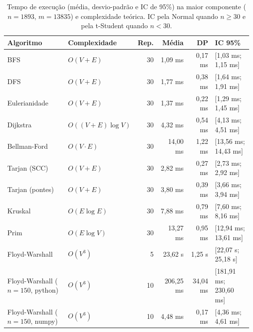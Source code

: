 \begin{table}
  \caption{Tempo de execução (média, desvio-padrão e IC de 95\%) na maior componente ($n=1893$, $m=13835$) e complexidade teórica. IC pela Normal quando $n\ge30$ e pela t-Student quando $n<30$.}
  \label{tab:tempos}
  \small
  \begin{tabular}{llrrrl}
    \toprule
    Algoritmo & Complexidade & Rep. & Média & DP & IC 95\% \\
    \midrule
    BFS & $O(V + E)$ & 30 & 1,09 ms & 0,17 ms & [1,03 ms; 1,15 ms] \\
    DFS & $O(V + E)$ & 30 & 1,77 ms & 0,38 ms & [1,64 ms; 1,91 ms] \\
    Eulerianidade & $O(V + E)$ & 30 & 1,37 ms & 0,22 ms & [1,29 ms; 1,45 ms] \\
    Dijkstra & $O((V + E) \log V)$ & 30 & 4,32 ms & 0,54 ms & [4,13 ms; 4,51 ms] \\
    Bellman-Ford & $O(V\cdot E)$ & 30 & 14,00 ms & 1,22 ms & [13,56 ms; 14,43 ms] \\
    Tarjan (SCC) & $O(V + E)$ & 30 & 2,82 ms & 0,27 ms & [2,73 ms; 2,92 ms] \\
    Tarjan (pontes) & $O(V + E)$ & 30 & 3,80 ms & 0,39 ms & [3,66 ms; 3,94 ms] \\
    Kruskal & $O(E \log E)$ & 30 & 7,88 ms & 0,79 ms & [7,60 ms; 8,16 ms] \\
    Prim & $O(E \log V)$ & 30 & 13,27 ms & 0,95 ms & [12,94 ms; 13,61 ms] \\
    Floyd-Warshall & $O(V^3)$ & 5 & 23,62 s & 1,25 s & [22,07 s; 25,18 s] \\
    Floyd-Warshall ($n=150$, python) & $O(V^3)$ & 10 & 206,25 ms & 34,04 ms & [181,91 ms; 230,60 ms] \\
    Floyd-Warshall ($n=150$, numpy) & $O(V^3)$ & 10 & 4,48 ms & 0,17 ms & [4,36 ms; 4,61 ms] \\
    \bottomrule
  \end{tabular}
\end{table}
